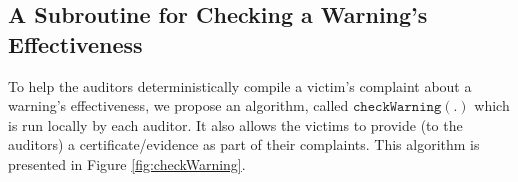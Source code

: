 
\vspace{-3mm}

\subsection{A Subroutine for Checking a Warning's Effectiveness}


To help the auditors deterministically compile a victim's complaint about a warning's effectiveness, we propose an algorithm,  called $\mathtt{checkWarning}(.)$ which is run locally by each auditor. It also allows the victims to provide (to the auditors) a certificate/evidence as part of their complaints.   This algorithm is presented in Figure \ref{fig:checkWarning}.




